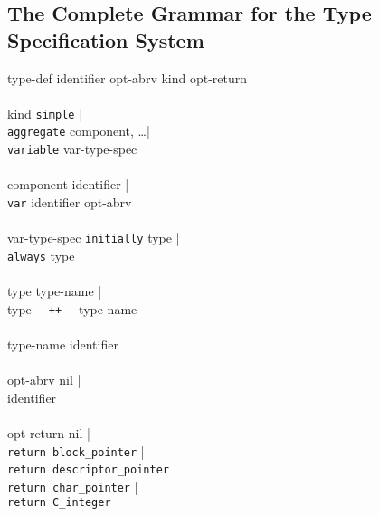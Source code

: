 \subsection{The Complete Grammar for the Type Specification System}
\begin{ebnf}
type-def \>\>\>\> \cceq \>\> identifier opt-abrv \tokcolon kind opt-return\\
\\
kind \>\>\>\>     \cceq \>\> \texttt{simple} |\\
\>\>\>\>\>\>      \texttt{aggregate} \toklbra component, \ldots \tokrbra |\\
\>\>\>\>\>\>      \texttt{variable} var-type-spec\\
\\
component \>\>\>\> \cceq \>\> identifier |\\
\>\>\>\>\>\>                  \texttt{var} identifier opt-abrv\\
\\
var-type-spec \>\>\>\>\cceq \>\> \texttt{initially} type |\\
\>\>\>\>\>\>                     \texttt{always} type\\
\\
type \>\>\>\> \cceq \>\> type-name |\\
\>\>\>\>\>\>             type \texttt{~~++~~} type-name\\
\\
type-name \>\>\>\> \cceq \>\> identifier\\
\\
opt-abrv \>\>\>\>  \cceq \>\> nil |\\
\>\>\>\>\>\>                    \toklcbra identifier \tokrcbra\\
\\
opt-return \>\>\>\>  \cceq \>\>nil |\\
\>\>\>\>\>\>      \texttt{return  block\_pointer} |\\
\>\>\>\>\>\>      \texttt{return  descriptor\_pointer} |\\
\>\>\>\>\>\>      \texttt{return  char\_pointer} |\\
\>\>\>\>\>\>      \texttt{return  C\_integer}\\
\end{ebnf}

\clearpage
\newpage
